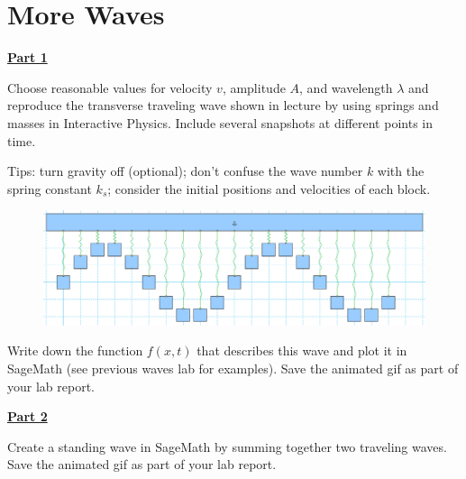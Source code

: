 \section{More Waves}

\underline{\textbf{Part 1}} \par

Choose reasonable values for velocity $v$, amplitude $A$, and wavelength $\lambda$ and reproduce the transverse traveling wave shown in lecture by using springs and masses in Interactive Physics.
Include several snapshots at different points in time.

\vspace{\baselineskip}

Tips: turn gravity off (optional); don't confuse the wave number $k$ with the spring constant $k_s$; consider the initial positions and velocities of each block.

\begin{figure}[H]
\includegraphics[scale=0.80]{figures/more-waves/fig1.png}
\end{figure}

Write down the function $f(x, t)$ that describes this wave and plot it in SageMath (see previous waves lab for examples).
Save the animated gif as part of your lab report.

\vspace{\baselineskip}

\underline{\textbf{Part 2}} \par

Create a standing wave in SageMath by summing together two traveling waves.
Save the animated gif as part of your lab report.


\pagebreak \clearpage
